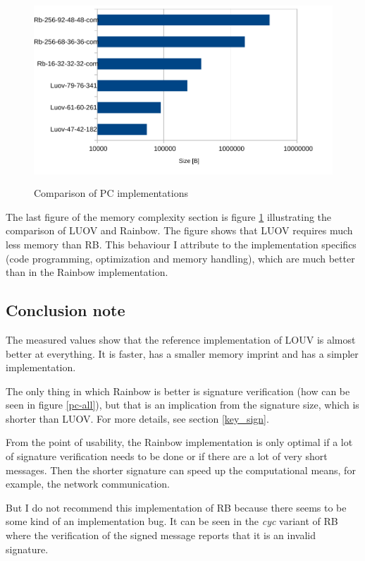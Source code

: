 \documentclass[thesis=M,english]{FITthesis}[2019/12/23]
\begin{document}
\begin{figure}[H]
\centering
\includegraphics[width=13cm,height=7cm]{images/mem-pc-all.pdf}
\caption{Comparison of PC implementations}
\label{mem-pc-all}
\end{figure}

\noindent
The last figure of the memory complexity section is figure \ref{mem-pc-all} illustrating the comparison of LUOV and Rainbow. The figure shows that LUOV requires much less memory than RB. This behaviour I attribute to the implementation specifics (code programming, optimization and memory handling), which are much better than in the Rainbow implementation. 

\subsection{Conclusion note}
The measured values show that the reference implementation of LOUV is almost better at everything. It is faster, has a smaller memory imprint and has a simpler implementation.

\bigskip
\noindent
The only thing in which Rainbow is better is signature verification (how can be seen in figure \ref{pc-all}), but that is an implication from the signature size, which is shorter than LUOV. For more details, see section \ref{key_sign}.

\bigskip
\noindent
From the point of usability, the Rainbow implementation is only optimal if a lot of signature verification needs to be done or if there are a lot of very short messages. Then the shorter signature can speed up the computational means, for example, the network communication. 

\bigskip
\noindent
But I do not recommend this implementation of RB because there seems to be some kind of an implementation bug. It can be seen in the \textit{cyc} variant of RB where the verification of the signed message reports that it is an invalid signature.
\end{document}
